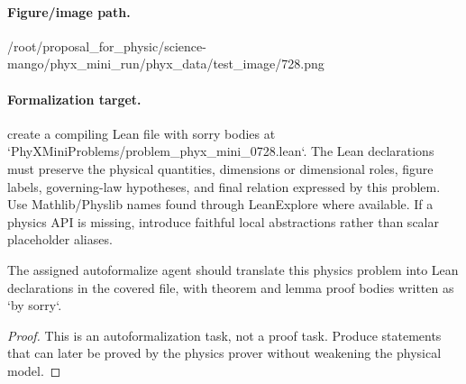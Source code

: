 \paragraph{Figure/image path.}
/root/proposal\_for\_physic/science-mango/phyx\_mini\_run/phyx\_data/test\_image/728.png

\paragraph{Formalization target.}
create a compiling Lean file with sorry bodies at `PhyXMiniProblems/problem\_phyx\_mini\_0728.lean`. The Lean declarations must preserve the physical quantities, dimensions or dimensional roles, figure labels, governing-law hypotheses, and final relation expressed by this problem.
Use Mathlib/Physlib names found through LeanExplore where available. If a physics API is missing, introduce faithful local abstractions rather than scalar placeholder aliases.

\begin{theorem}
\label{thm:physics:phyx_mini_0728:target}
The assigned autoformalize agent should translate this physics problem into Lean declarations in the covered file, with theorem and lemma proof bodies written as `by sorry`.
\end{theorem}
\begin{proof}
This is an autoformalization task, not a proof task. Produce statements that can later be proved by the physics prover without weakening the physical model.
\end{proof}

